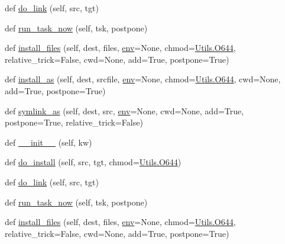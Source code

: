 \begin{DoxyCompactItemize}
\item 
def \hyperlink{classwaflib_1_1_build_1_1_install_context_ac012afc7dd8fb657141d28ad571392f4}{do\+\_\+link} (self, src, tgt)
\item 
def \hyperlink{classwaflib_1_1_build_1_1_install_context_ab9691686f803c54151ec5bbc92717a0f}{run\+\_\+task\+\_\+now} (self, tsk, postpone)
\item 
def \hyperlink{classwaflib_1_1_build_1_1_install_context_af07f1f67998c0f4a6d20361cd28ee0bc}{install\+\_\+files} (self, dest, files, \hyperlink{classwaflib_1_1_build_1_1_build_context_ac3b464a969bc6c898c739b6d820b2219}{env}=None, chmod=\hyperlink{namespacewaflib_1_1_utils_ade9dd27fadbf52a0641bbff06d3dd3ac}{Utils.\+O644}, relative\+\_\+trick=False, cwd=None, add=True, postpone=True)
\item 
def \hyperlink{classwaflib_1_1_build_1_1_install_context_a7a653c97bec879bfd813d525c8c0caf3}{install\+\_\+as} (self, dest, srcfile, \hyperlink{classwaflib_1_1_build_1_1_build_context_ac3b464a969bc6c898c739b6d820b2219}{env}=None, chmod=\hyperlink{namespacewaflib_1_1_utils_ade9dd27fadbf52a0641bbff06d3dd3ac}{Utils.\+O644}, cwd=None, add=True, postpone=True)
\item 
def \hyperlink{classwaflib_1_1_build_1_1_install_context_a25a3977cdde84cb8b06ce8316acc686b}{symlink\+\_\+as} (self, dest, src, \hyperlink{classwaflib_1_1_build_1_1_build_context_ac3b464a969bc6c898c739b6d820b2219}{env}=None, cwd=None, add=True, postpone=True, relative\+\_\+trick=False)
\item 
def \hyperlink{classwaflib_1_1_build_1_1_install_context_a92d1f07459687e8da5a0e871eeb462f0}{\+\_\+\+\_\+init\+\_\+\+\_\+} (self, kw)
\item 
def \hyperlink{classwaflib_1_1_build_1_1_install_context_a389ce541ae521e6e4e616cfddf89bd7e}{do\+\_\+install} (self, src, tgt, chmod=\hyperlink{namespacewaflib_1_1_utils_ade9dd27fadbf52a0641bbff06d3dd3ac}{Utils.\+O644})
\item 
def \hyperlink{classwaflib_1_1_build_1_1_install_context_ac012afc7dd8fb657141d28ad571392f4}{do\+\_\+link} (self, src, tgt)
\item 
def \hyperlink{classwaflib_1_1_build_1_1_install_context_ab9691686f803c54151ec5bbc92717a0f}{run\+\_\+task\+\_\+now} (self, tsk, postpone)
\item 
def \hyperlink{classwaflib_1_1_build_1_1_install_context_af07f1f67998c0f4a6d20361cd28ee0bc}{install\+\_\+files} (self, dest, files, \hyperlink{classwaflib_1_1_build_1_1_build_context_ac3b464a969bc6c898c739b6d820b2219}{env}=None, chmod=\hyperlink{namespacewaflib_1_1_utils_ade9dd27fadbf52a0641bbff06d3dd3ac}{Utils.\+O644}, relative\+\_\+trick=False, cwd=None, add=True, postpone=True)

\end{DoxyCompactItemize}
